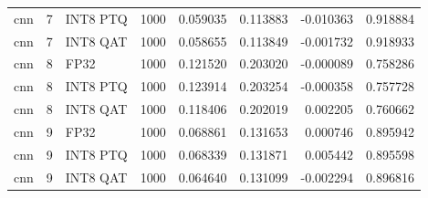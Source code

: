 \begin{tabular}{lrlrrrrr}
cnn & 7 & INT8 PTQ & 1000 & 0.059035 & 0.113883 & -0.010363 & 0.918884 \\
cnn & 7 & INT8 QAT & 1000 & 0.058655 & 0.113849 & -0.001732 & 0.918933 \\
cnn & 8 & FP32 & 1000 & 0.121520 & 0.203020 & -0.000089 & 0.758286 \\
cnn & 8 & INT8 PTQ & 1000 & 0.123914 & 0.203254 & -0.000358 & 0.757728 \\
cnn & 8 & INT8 QAT & 1000 & 0.118406 & 0.202019 & 0.002205 & 0.760662 \\
cnn & 9 & FP32 & 1000 & 0.068861 & 0.131653 & 0.000746 & 0.895942 \\
cnn & 9 & INT8 PTQ & 1000 & 0.068339 & 0.131871 & 0.005442 & 0.895598 \\
cnn & 9 & INT8 QAT & 1000 & 0.064640 & 0.131099 & -0.002294 & 0.896816 \\
\bottomrule
\end{tabular}
